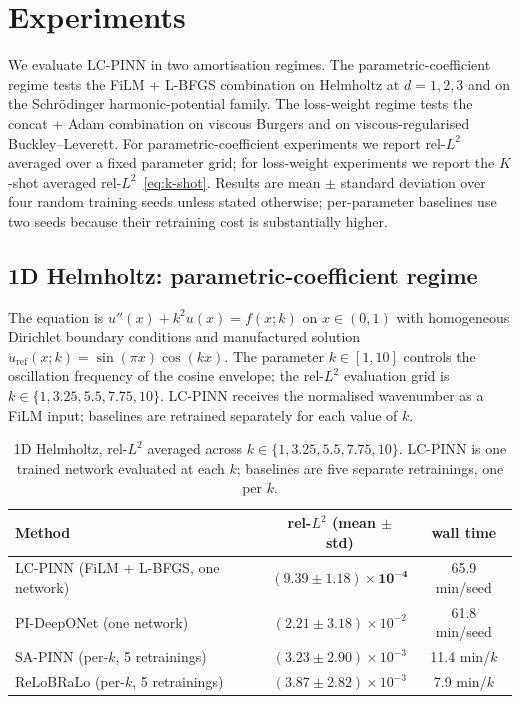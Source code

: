 \documentclass[12pt,a4paper]{extarticle}
\begin{document}
\newpage

\section{Experiments}
\label{sec:experiments}

We evaluate LC-PINN in two amortisation regimes. The parametric-coefficient regime tests the FiLM + L-BFGS combination on Helmholtz at $d = 1, 2, 3$ and on the Schr\"{o}dinger harmonic-potential family. The loss-weight regime tests the concat + Adam combination on viscous Burgers and on viscous-regularised Buckley--Leverett. For parametric-coefficient experiments we report rel-$L^2$ averaged over a fixed parameter grid; for loss-weight experiments we report the $K$-shot averaged rel-$L^2$~\eqref{eq:k-shot}. Results are mean $\pm$ standard deviation over four random training seeds unless stated otherwise; per-parameter baselines use two seeds because their retraining cost is substantially higher.

\subsection{1D Helmholtz: parametric-coefficient regime}

The equation is $u''(x) + k^2 u(x) = f(x; k)$ on $x \in (0, 1)$ with homogeneous Dirichlet boundary conditions and manufactured solution $u_{\mathrm{ref}}(x; k) = \sin(\pi x) \cos(k x)$. The parameter $k \in [1, 10]$ controls the oscillation frequency of the cosine envelope; the rel-$L^2$ evaluation grid is $k \in \{1, 3.25, 5.5, 7.75, 10\}$. LC-PINN receives the normalised wavenumber as a FiLM input; baselines are retrained separately for each value of $k$.

\begin{table}[H]
\caption{1D Helmholtz, rel-$L^2$ averaged across $k \in \{1, 3.25, 5.5, 7.75, 10\}$. LC-PINN is one trained network evaluated at each $k$; baselines are five separate retrainings, one per $k$.}
\label{table:helm1d}
\centering
\begin{tabular}{lcc}
\toprule
Method & rel-$L^2$ (mean $\pm$ std) & wall time \\
\midrule
LC-PINN (FiLM + L-BFGS, one network) & $\mathbf{(9.39 \pm 1.18) \times 10^{-4}}$ & 65.9 min/seed \\
PI-DeepONet (one network)            & $(2.21 \pm 3.18) \times 10^{-2}$        & 61.8 min/seed \\
SA-PINN (per-$k$, 5 retrainings)     & $(3.23 \pm 2.90) \times 10^{-3}$        & 11.4 min/$k$ \\
ReLoBRaLo (per-$k$, 5 retrainings)   & $(3.87 \pm 2.82) \times 10^{-3}$        & 7.9 min/$k$ \\
\bottomrule
\end{tabular}
\end{table}
\end{document}
